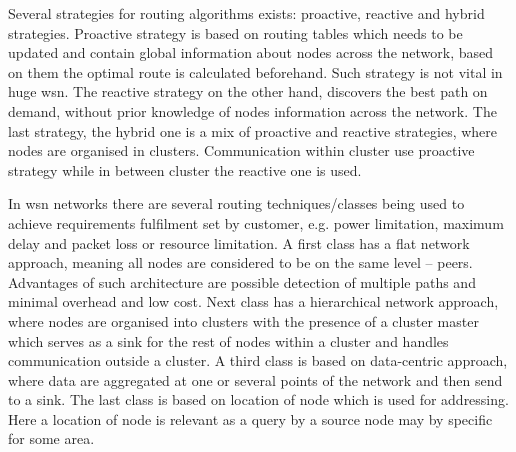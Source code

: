 Several strategies for routing algorithms exists: proactive, reactive and hybrid strategies. Proactive strategy is based on routing tables which needs to be updated and contain global information about nodes across the network, based on them the optimal route is calculated beforehand. Such strategy is not vital in huge \acrshort{wsn}. The reactive strategy on the other hand, discovers the best path on demand, without prior knowledge of nodes information across the network. The last strategy, the hybrid one is a mix of proactive and reactive strategies, where nodes are organised in clusters. Communication within cluster use proactive strategy while in between cluster the reactive one is used.

In \acrshort{wsn} networks there are several routing techniques/classes being used to achieve requirements fulfilment set by customer, e.g. power limitation, maximum delay and packet loss or resource limitation. A first class has a flat network approach, meaning all nodes are considered to be on the same level – peers. Advantages of such architecture are possible detection of multiple paths and minimal overhead and low cost. Next class has a hierarchical network approach, where nodes are organised into clusters with the presence of a cluster master which serves as a sink for the rest of nodes within a cluster and handles communication outside a cluster. A  third class is based on data-centric approach, where data are aggregated at one or several points of the network and then send to a sink. The last class is based on location of node which is used for addressing. Here a location of node is relevant as a query by a source node may by specific for some area.